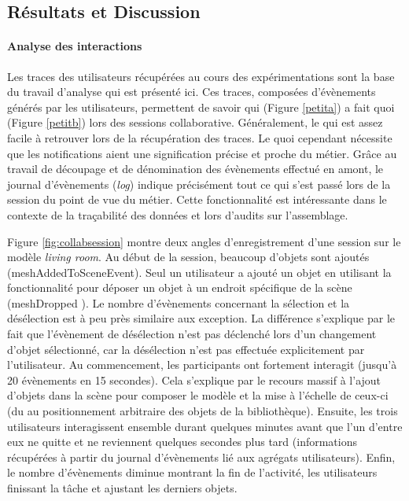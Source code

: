 \subsection{Résultats et Discussion}
\label{sec:res}


\paragraph{Analyse des interactions}
Les traces des utilisateurs récupérées au cours des expérimentations sont la base 
du travail d'analyse qui est présenté ici. Ces traces, composées d'évènements 
générés par les utilisateurs, permettent de savoir qui (Figure \ref{petita}) a fait quoi 
(Figure \ref{petitb}) lors des sessions collaborative. Généralement, le \og qui\fg{} 
est assez facile à retrouver lors de la récupération des traces. Le \og quoi\fg{} 
cependant nécessite que les notifications aient une signification précise et proche 
du métier. Grâce au travail de découpage et de dénomination des évènements 
effectué en amont, le journal d'évènements (\textit{log}) indique précisément tout 
ce 
qui s'est passé lors de la session du point de vue du métier. Cette fonctionnalité 
est 
intéressante dans le contexte de la traçabilité des données et lors d'audits sur 
l'assemblage. 

Figure \ref{fig:collabsession} montre deux angles d'enregistrement d'une session 
sur le modèle \textit{living room}. Au début de la session, beaucoup d'objets sont 
ajoutés (meshAddedToSceneEvent). Seul un utilisateur a ajouté un objet en 
utilisant la fonctionnalité pour déposer un objet à un endroit spécifique de la scène 
(meshDropped ). Le nombre d'évènements concernant la sélection et 
la désélection est à peu près similaire aux exception. La différence s'explique par 
le fait que l'évènement de désélection n'est pas déclenché lors d'un changement 
d'objet sélectionné, car la désélection n'est pas effectuée explicitement par 
l'utilisateur. Au commencement, les participants ont fortement interagit (jusqu'à 20 
évènements en 15 secondes). Cela s'explique par le recours massif à l'ajout 
d'objets dans la scène pour composer le modèle et la mise à l'échelle de ceux-ci 
(du au positionnement arbitraire des objets de la bibliothèque). Ensuite, les trois 
utilisateurs interagissent ensemble durant quelques minutes avant que l'un d'entre 
eux ne quitte et ne reviennent quelques secondes plus tard (informations 
récupérées à partir du journal d'évènements lié aux agrégats utilisateurs). Enfin, le 
nombre d'évènements diminue montrant la fin de l'activité, les utilisateurs finissant 
la tâche et ajustant les derniers objets.

